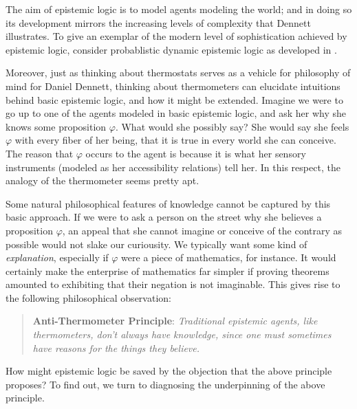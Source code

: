 \documentclass[11pt]{article}
\numberwithin{equation}{subsection}
\renewcommand{\phi}{\varphi}
\begin{document}
The aim of epistemic logic is to model agents modeling the world; and
in doing so its development mirrors the increasing levels of
complexity that Dennett illustrates.  To give an exemplar of the
modern level of sophistication achieved by epistemic logic, consider
probablistic dynamic epistemic logic as developed in \citep{van_benthem_dynamic_2009}.

Moreover, just as thinking about thermostats serves as a vehicle for
philosophy of mind for Daniel Dennett, thinking about
thermometers can elucidate intuitions behind basic epistemic logic,
and how it might be extended.
Imagine we were to go up to one of the agents modeled in basic
epistemic logic, and ask her why she knows some
proposition $\phi$. What would she possibly say?  She would say she feels
$\phi$ with every fiber of her being, that it is true in every
world she can conceive.  The reason that $\phi$ occurs to
the agent is because it is what her sensory instruments (modeled as her
accessibility relations) tell her.   In this respect, the analogy of
the thermometer seems pretty apt.

Some natural philosophical features of knowledge 
cannot be captured by this basic approach.
If we were to ask a person on the street why she believes a
proposition $\phi$, an appeal that she cannot imagine or
conceive of the contrary as possible would not slake our curiousity.
We typically want some kind of
\emph{explanation}, especially if $\phi$ were a piece of mathematics, for
instance.  It would certainly make the enterprise of mathematics far
simpler if proving theorems amounted to exhibiting that their negation
is not imaginable. This gives rise to the following philosophical observation:
\begin{quote}
\textbf{Anti-Thermometer Principle}: \emph{Traditional epistemic agents,
  like thermometers, don't always have knowledge, since one must
  sometimes have reasons for the things they believe.}
\end{quote}

How might epistemic logic be saved by the objection that the above
principle proposes?  To find out, we turn to diagnosing the
underpinning of the above principle.
\end{document}
